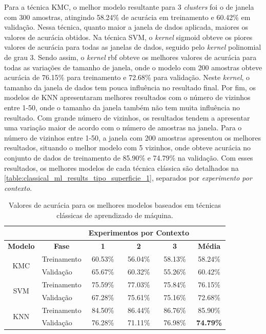 Para a técnica KMC, o melhor modelo resultante para 3 \textit{clusters} foi o de janela com 300 amostras, atingindo 58.24\% de acurácia em treinamento e 60.42\% em validação. Nessa técnica, quanto maior a janela de dados aplicada, maiores os valores de acurácia obtidos. Na técnica SVM, o \textit{kernel} sigmoid obteve os piores valores de acurácia para todas as janelas de dados, seguido pelo \textit{kernel} polinomial de grau 3. Sendo assim, o \textit{kernel} rbf obteve os melhores valores de acurácia para todas as variações de tamanho de janela, onde o modelo com 200 amostras obteve acurácia de 76.15\% para treinamento e 72.68\% para validação. Neste \textit{kernel}, o tamanho da janela de dados tem pouca influência no resultado final. Por fim, os modelos de KNN apresentaram melhores resultados com o número de vizinhos entre 1-50, onde o tamanho da janela também não tem muita influência no resultado. Com grande número de vizinhos, os resultados tendem a apresentar uma variação maior de acordo com o número de amostras na janela. Para o número de vizinhos entre 1-50, a janela com 200 amostras apresentou os melhores resultados, situando o melhor modelo com 5 vizinhos, onde obteve acurácia no conjunto de dados de treinamento de 85.90\% e 74.79\% na validação. Com esses resultados, os melhores modelos de cada técnica clássica são detalhados na \autoref{table:classical_ml_results_tipo_superficie_1}, separados por \emph{experimento por contexto}.

\begin{table}[H]
\scriptsize
\centering
\caption{Valores de acurácia para os melhores modelos baseados em técnicas clássicas de aprendizado de máquina.} 
\label{table:classical_ml_results_tipo_superficie_1}
\begin{tabular}{clcccc}
\cmidrule(lr){3-5}
& & \multicolumn{3}{c}{\textbf{Experimentos por Contexto}} & \multicolumn{1}{c}{} \\ \midrule
\textbf{Modelo} & \multicolumn{1}{c}{\textbf{Fase}} & \textbf{1} & \textbf{2} & \textbf{3} & \textbf{Média} \\ \midrule
\multirow{2}{*}{KMC} & Treinamento & 60.53\% & 56.04\% & 58.13\% & 58.24\% \\ \cmidrule(l){2-6} 
 & Validação & 65.67\% & 60.32\% & 55.26\% & 60.42\% \\ \midrule
\multirow{2}{*}{SVM} & Treinamento & 75.59\% & 77.03\% & 75.84\% & 76.15\% \\ \cmidrule(l){2-6} 
 & Validação & 67.28\% & 75.61\% & 75.16\% & 72.68\% \\ \midrule
\multirow{2}{*}{KNN} & Treinamento & 84.50\% & 86.44\% & 86.76\% & 85.90\% \\ \cmidrule(l){2-6} 
 & Validação & 76.28\% & 71.11\% & 76.98\% & \cellcolor[HTML]{34FF34}\textbf{74.79\%} \\ \bottomrule
\end{tabular}
\end{table}

